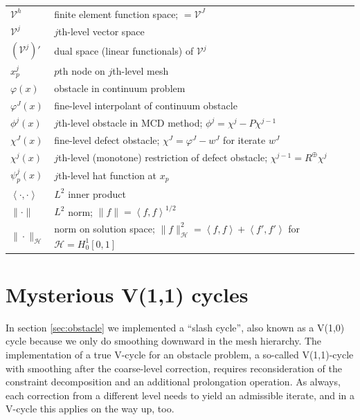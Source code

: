 \documentclass[letterpaper,final,12pt,reqno]{amsart}
\theoremstyle{claim}
\newcommand{\ip}[2]{\left<#1,#2\right>}
\newcommand{\mR}{R^{\bm{\oplus}}}
\numberwithin{equation}{section}
\numberwithin{figure}{section}
\numberwithin{table}{section}
\numberwithin{theorem}{section}
\begin{document}
\begin{longtable}{l|l}
$\mathcal{V}^h$ & finite element function space; $= \mathcal{V}^J$ \\
$\mathcal{V}^j$ & $j$th-level vector space \\
$(\mathcal{V}^j)'$ & dual space (linear functionals) of $\mathcal{V}^j$  \\
$x_p^j$ & $p$th node on $j$th-level mesh \\
$\varphi(x)$ & obstacle in continuum problem \\
$\varphi^J(x)$ & fine-level interpolant of continuum obstacle \\
$\phi^j(x)$ & $j$th-level obstacle in MCD method; $\phi^j=\chi^j - P\chi^{j-1}$ \\
$\chi^J(x)$ & fine-level defect obstacle; $\chi^J = \varphi^J - w^J$ for iterate $w^J$ \\
$\chi^j(x)$ & $j$th-level (monotone) restriction of defect obstacle; $\chi^{j-1} = \mR \chi^j$ \\
$\psi_p^j(x)$ & $j$th-level hat function at $x_p$ \\
$\ip{\cdot}{\cdot}$ & $L^2$ inner product \\
$\|\cdot\|$ & $L^2$ norm; $\|f\|=\ip{f}{f}^{1/2}$ \\
$\|\cdot\|_{\mathcal{H}}$ & norm on solution space; $\|f\|_{\mathcal{H}}^2 =\ip{f}{f} + \ip{f'}{f'}$ for $\mathcal{H}=H_0^1[0,1]$
\end{longtable}


\section{Mysterious V(1,1) cycles}  In section \ref{sec:obstacle} we implemented a ``slash cycle'', also known as a V(1,0) cycle because we only do smoothing downward in the mesh hierarchy.  The implementation of a true V-cycle for an obstacle problem, a so-called V(1,1)-cycle \cite{GraeserKornhuber2009} with smoothing after the coarse-level correction, requires reconsideration of the constraint decomposition and an additional prolongation operation.  As always, each correction from a different level needs to yield an admissible iterate, and in a V-cycle this applies on the way up, too.
\end{document}
